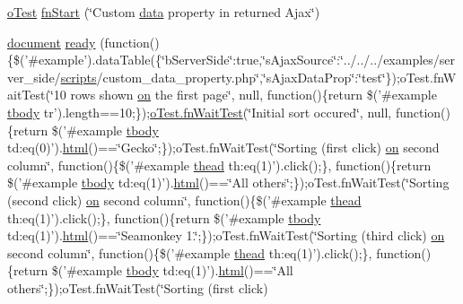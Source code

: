 \begin{DoxyCompactItemize}
\item 
\hyperlink{unit__test_8js_a3b2d259e2df3b6860d9047a92d09d0d6}{o\+Test} \hyperlink{4__server-side_2s_ajax_data_prop_8js_a2cb07b3d812e47e72015702fa1b9a5f6}{fn\+Start} (\char`\"{}Custom \hyperlink{fullpage_2plugin_8js_a718c1bf5a3bf21ebb980203b142e5b75}{data} property in returned Ajax\char`\"{})
\item 
\hyperlink{outside_events_8js_aa14f8e0338cced6720590fd2ea13bd4b}{document} \hyperlink{4__server-side_2s_ajax_data_prop_8js_a91c348fc01dff151da47896b14440f3b}{ready} (function()\{\$('\#example').data\+Table(\{\char`\"{}b\+Server\+Side\char`\"{}\+:true,\char`\"{}s\+Ajax\+Source\char`\"{}\+:\char`\"{}../../../examples/server\+\_\+side/\hyperlink{tinymce_8jquery_8dev_8js_a09066d4d580eeec222f858d588b4cdef}{scripts}/custom\+\_\+data\+\_\+property.\+php\char`\"{},\char`\"{}s\+Ajax\+Data\+Prop\char`\"{}\+:\char`\"{}test\char`\"{}\});o\+Test.\+fn\+Wait\+Test(\char`\"{}10 rows shown \hyperlink{fullpage_2plugin_8min_8js_a1cfa98b7fed2aaf9fee3b68dbb7f9497}{on} the first page\char`\"{}, null, function()\{return \$('\#example \hyperlink{core_8constructor_8js_a99b0542c7c50fe8757c55bf9dac5f3be}{tbody} tr').length==10;\});\hyperlink{onhold_24__server-side_2__zero__config_8js_ab25c4d596771c0133cdc45178ce72c3d}{o\+Test.\+fn\+Wait\+Test}(\char`\"{}Initial sort occured\char`\"{}, null, function()\{return \$('\#example \hyperlink{core_8constructor_8js_a99b0542c7c50fe8757c55bf9dac5f3be}{tbody} td\+:eq(0)').\hyperlink{tinymce_8jquery_8dev_8js_ac2090bcf2ff968c0083d5de53a6544f3}{html}()==\char`\"{}Gecko\char`\"{};\});o\+Test.\+fn\+Wait\+Test(\char`\"{}Sorting (first click) \hyperlink{fullpage_2plugin_8min_8js_a1cfa98b7fed2aaf9fee3b68dbb7f9497}{on} second column\char`\"{}, function()\{\$('\#example \hyperlink{core_8constructor_8js_a856be760b6816c9591ce69f0a2b43693}{thead} th\+:eq(1)').click();\}, function()\{return \$('\#example \hyperlink{core_8constructor_8js_a99b0542c7c50fe8757c55bf9dac5f3be}{tbody} td\+:eq(1)').\hyperlink{tinymce_8jquery_8dev_8js_ac2090bcf2ff968c0083d5de53a6544f3}{html}()==\char`\"{}All others\char`\"{};\});o\+Test.\+fn\+Wait\+Test(\char`\"{}Sorting (second click) \hyperlink{fullpage_2plugin_8min_8js_a1cfa98b7fed2aaf9fee3b68dbb7f9497}{on} second column\char`\"{}, function()\{\$('\#example \hyperlink{core_8constructor_8js_a856be760b6816c9591ce69f0a2b43693}{thead} th\+:eq(1)').click();\}, function()\{return \$('\#example \hyperlink{core_8constructor_8js_a99b0542c7c50fe8757c55bf9dac5f3be}{tbody} td\+:eq(1)').\hyperlink{tinymce_8jquery_8dev_8js_ac2090bcf2ff968c0083d5de53a6544f3}{html}()==\char`\"{}Seamonkey 1.\char`\"{};\});o\+Test.\+fn\+Wait\+Test(\char`\"{}Sorting (third click) \hyperlink{fullpage_2plugin_8min_8js_a1cfa98b7fed2aaf9fee3b68dbb7f9497}{on} second column\char`\"{}, function()\{\$('\#example \hyperlink{core_8constructor_8js_a856be760b6816c9591ce69f0a2b43693}{thead} th\+:eq(1)').click();\}, function()\{return \$('\#example \hyperlink{core_8constructor_8js_a99b0542c7c50fe8757c55bf9dac5f3be}{tbody} td\+:eq(1)').\hyperlink{tinymce_8jquery_8dev_8js_ac2090bcf2ff968c0083d5de53a6544f3}{html}()==\char`\"{}All others\char`\"{};\});o\+Test.\+fn\+Wait\+Test(\char`\"{}Sorting (first click) 
\end{DoxyCompactItemize}
